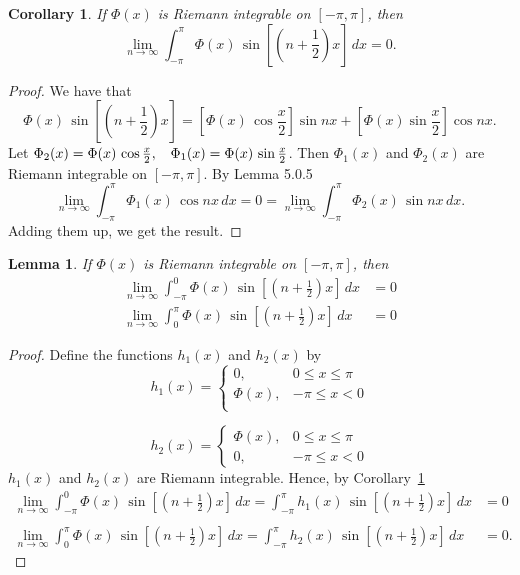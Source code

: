 \documentclass[12pt,a4paper]{report}
\theoremstyle{definition}
\theoremstyle{plain}
\newtheorem{coro}[thm]{Corollary}
\newtheorem{lem}[thm]{Lemma}
\begin{document}
\begin{coro}
\label{coro:rl}
If $\Phi (x)$ is Riemann integrable on $[-\pi,\pi]$, then $$\lim_{n\rightarrow \infty}\int_{-\pi}^{\pi}\Phi(x)\, \sin\left[\left(n + \frac{1}{2}\right) x\right] \, dx = 0.$$
\end{coro}

\begin{proof}
We have that 
$$\Phi(x)\, \sin \left[\left(n + \frac{1}{2}\right)x\right] = \left[\Phi(x)\, \cos \frac{x}{2}\right] \sin nx + \left[\Phi(x)\sin \frac{x}{2}\right] \cos nx.$$
Let $\Phi_2(x) = \Phi(x)\, \cos \frac{x}{2},\,\, \hspace{0.2cm} \Phi_1(x) = \Phi(x)\, \sin \frac{x}{2}$. Then $\Phi_1(x)$ and $\Phi_2(x)$ are Riemann integrable on $[-\pi, \pi]$. By Lemma 5.0.5
$$\lim_{n\rightarrow \infty} \int_{-\pi}^{\pi} \Phi_1(x)\, \cos nx\, dx = 0 = \lim_{n\rightarrow \infty}\int_{-\pi}^{\pi} \Phi_2(x)\, \sin nx\, dx.$$
Adding them up, we get the result.
\end{proof}




\begin{lem}
If $\Phi(x)$ is Riemann integrable on $[-\pi, \pi]$, then
\begin{align*}
\lim_{n\rightarrow \infty} \int_{-\pi}^0\Phi(x)\, \sin \left[\left(n + \frac{1}{2}\right)x\right]\, dx  & = 0\\
\lim_{n\rightarrow \infty} \int_0^{\pi}\Phi(x)\, \sin \left[\left(n + \frac{1}{2}\right) x\right]\, dx  & = 0
\end{align*}
\end{lem}

\begin{proof}
Define the functions $h_1(x)$ and $h_2(x)$ by
$$h_1(x) = \begin{cases}
            0, & 0\leq x \leq \pi\\
            \Phi(x), & -\pi\leq x < 0\\
           \end{cases}$$
           
$$h_2(x) = \begin{cases}
           \Phi(x), & 0 \leq x \leq \pi\\
           0, & -\pi \leq x < 0
           \end{cases}$$
$h_1(x)$ and $h_2(x)$ are Riemann integrable. Hence, by Corollary~\ref{coro:rl}
\begin{align*}
\lim_{n\rightarrow \infty}\int_{-\pi}^0\Phi(x)\, \sin\left[\left(n + \frac{1}{2}\right)x\right]\, dx = \int_{-\pi}^{\pi} h_1(x)\, \sin\left[\left(n + \frac{1}{2}\right)x\right]\, dx & = 0\\\\
\lim_{n\rightarrow \infty}\int^{\pi}_0\Phi(x)\, \sin\left[\left(n + \frac{1}{2}\right)x\right]\, dx = \int_{-\pi}^{\pi} h_2(x)\, \sin\left[\left(n + \frac{1}{2}\right)x\right]\, dx & = 0.
\end{align*}
\end{proof}
\end{document}
